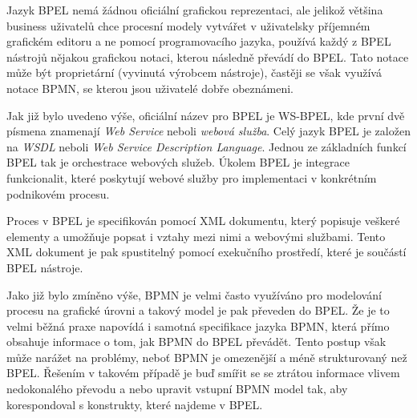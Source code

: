 Jazyk BPEL nemá žádnou oficiální grafickou reprezentaci, ale jelikož většina business uživatelů chce procesní modely vytvářet v uživatelsky příjemném grafickém editoru a ne pomocí programovacího jazyka, používá každý z BPEL nástrojů nějakou grafickou notaci, kterou následně převádí do BPEL. Tato notace může být proprietární (vyvinutá výrobcem nástroje), častěji se však využívá notace BPMN, se kterou jsou uživatelé dobře obeznámeni.

Jak již bylo uvedeno výše, oficiální název pro BPEL je WS-BPEL, kde první dvě písmena znamenají \textit{Web Service} neboli \textit{webová služba}. Celý jazyk BPEL je založen na \textit{WSDL} neboli \textit{Web Service Description Language}. Jednou ze základních funkcí BPEL tak je orchestrace webových služeb. Úkolem BPEL je integrace funkcionalit, které poskytují webové služby pro implementaci v konkrétním podnikovém procesu.

Proces v BPEL je specifikován pomocí XML dokumentu, který popisuje veškeré elementy a umožňuje popsat i vztahy mezi nimi a webovými službami. Tento XML dokument je pak spustitelný pomocí exekučního prostředí, které je součástí BPEL nástroje.

Jako již bylo zmíněno výše, BPMN je velmi často využíváno pro modelování procesu na grafické úrovni a takový model je pak převeden do BPEL. Že je to velmi běžná praxe napovídá i samotná specifikace jazyka BPMN, která přímo obsahuje informace o tom, jak BPMN do BPEL převádět. Tento postup však může narážet na problémy, neboť BPMN je omezenější a méně strukturovaný než BPEL. Řešením v takovém případě je buď smířit se se ztrátou informace vlivem nedokonalého převodu a nebo upravit vstupní BPMN model tak, aby korespondoval s konstrukty, které najdeme v BPEL. \cite{Cerny2010}